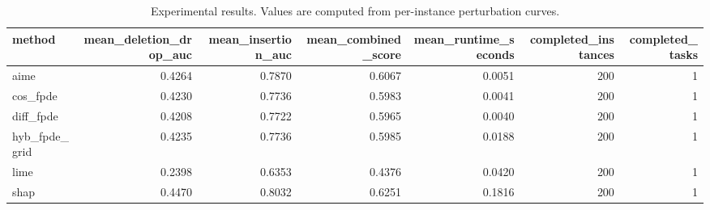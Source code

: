 \begin{table}[t]
\caption{Experimental results. Values are computed from per-instance perturbation curves.}
\label{tab:main_results_computed}
\centering
\begin{tabular}{lrrrrrr}
\toprule
method & mean\_deletion\_drop\_auc & mean\_insertion\_auc & mean\_combined\_score & mean\_runtime\_seconds & completed\_instances & completed\_tasks \\
\midrule
aime & 0.4264 & 0.7870 & 0.6067 & 0.0051 & 200 & 1 \\
cos\_fpde & 0.4230 & 0.7736 & 0.5983 & 0.0041 & 200 & 1 \\
diff\_fpde & 0.4208 & 0.7722 & 0.5965 & 0.0040 & 200 & 1 \\
hyb\_fpde\_grid & 0.4235 & 0.7736 & 0.5985 & 0.0188 & 200 & 1 \\
lime & 0.2398 & 0.6353 & 0.4376 & 0.0420 & 200 & 1 \\
shap & 0.4470 & 0.8032 & 0.6251 & 0.1816 & 200 & 1 \\
\bottomrule
\end{tabular}

\end{table}
